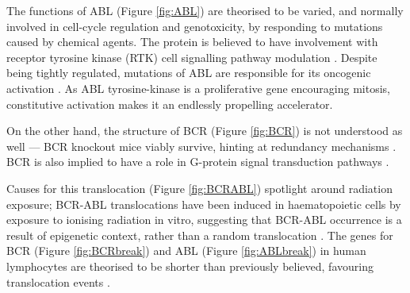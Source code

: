 The functions of ABL (Figure \ref{fig:ABL}) are theorised to be varied, and normally involved in cell-cycle regulation and genotoxicity, by responding to mutations caused by chemical agents. The protein is believed to have involvement with receptor tyrosine kinase (RTK) cell signalling pathway modulation \citep{RefWorks:doc:5834545de4b09a21e93790d0}. Despite being tightly regulated, mutations of ABL are responsible for its oncogenic activation \citep{RefWorks:doc:5836f6cee4b066125b20d2e0,RefWorks:doc:5836f703e4b09a21e9383112,RefWorks:doc:583455c2e4b09a21e93790f8}. As ABL tyrosine-kinase is a proliferative gene encouraging mitosis, constitutive activation makes it an endlessly propelling accelerator.

On the other hand, the structure of BCR (Figure \ref{fig:BCR}) is not understood as well --- BCR knockout mice viably survive, hinting at redundancy mechanisms \citep{RefWorks:doc:58345bf8e4b027b9d41441c6}. BCR is also implied to have a role in G-protein signal transduction pathways \citep{RefWorks:doc:59ac0ccce4b021c5b154a8cb}.

Causes for this translocation (Figure \ref{fig:BCRABL}) spotlight around radiation exposure; BCR-ABL translocations have been induced in haematopoietic cells by exposure to ionising radiation in vitro, suggesting that BCR-ABL occurrence is a result of epigenetic context, rather than a random translocation \citep{RefWorks:doc:58347d5be4b066125b203ebd}. The genes for BCR (Figure \ref{fig:BCRbreak}) and ABL (Figure \ref{fig:ABLbreak}) in human lymphocytes are theorised to be shorter than previously believed, favouring translocation events \citep{RefWorks:doc:58347da0e4b066125b203ed0}.

